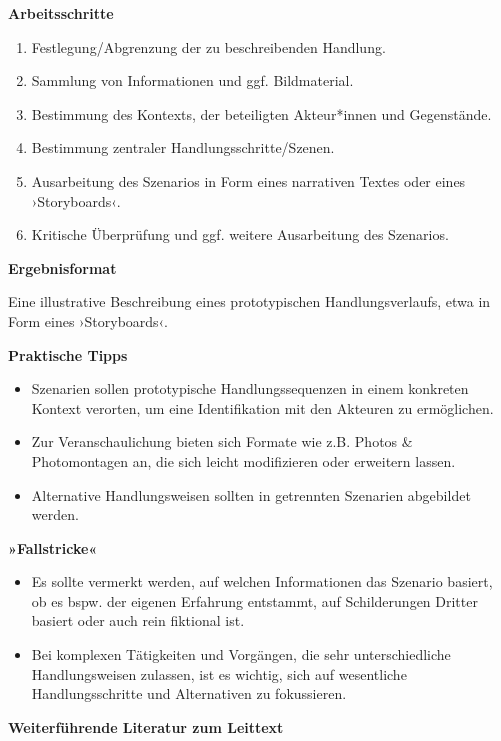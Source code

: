 \documentclass[
  a4paper,
]{book}
\providecommand{\tightlist}{%
  \setlength{\itemsep}{0pt}\setlength{\parskip}{0pt}}
\begin{document}
\textbf{Arbeitsschritte}

\begin{enumerate}
\def\labelenumi{\arabic{enumi}.}
\tightlist
\item
  Festlegung/Abgrenzung der zu beschreibenden Handlung.
\item
  Sammlung von Informationen und ggf. Bildmaterial.
\item
  Bestimmung des Kontexts, der beteiligten Akteur*innen und Gegenstände.
\item
  Bestimmung zentraler Handlungsschritte/Szenen.
\item
  Ausarbeitung des Szenarios in Form eines narrativen Textes oder eines ›Storyboards‹.
\item
  Kritische Überprüfung und ggf. weitere Ausarbeitung des Szenarios.
\end{enumerate}

\textbf{Ergebnisformat}

Eine illustrative Beschreibung eines prototypischen Handlungsverlaufs, etwa in Form eines ›Storyboards‹.

\textbf{Praktische Tipps}

\begin{itemize}
\tightlist
\item
  Szenarien sollen prototypische Handlungssequenzen in einem konkreten Kontext verorten, um eine Identifikation mit den Akteuren zu ermöglichen.
\item
  Zur Veranschaulichung bieten sich Formate wie z.B. Photos \& Photomontagen an, die sich leicht modifizieren oder erweitern lassen.
\item
  Alternative Handlungsweisen sollten in getrennten Szenarien abgebildet werden.
\end{itemize}

\textbf{»Fallstricke«}

\begin{itemize}
\tightlist
\item
  Es sollte vermerkt werden, auf welchen Informationen das Szenario basiert, ob es bspw. der eigenen Erfahrung entstammt, auf Schilderungen Dritter basiert oder auch rein fiktional ist.
\item
  Bei komplexen Tätigkeiten und Vorgängen, die sehr unterschiedliche Handlungsweisen zulassen, ist es wichtig, sich auf wesentliche Handlungsschritte und Alternativen zu fokussieren.
\end{itemize}

\textbf{Weiterführende Literatur zum Leittext}
\end{document}
